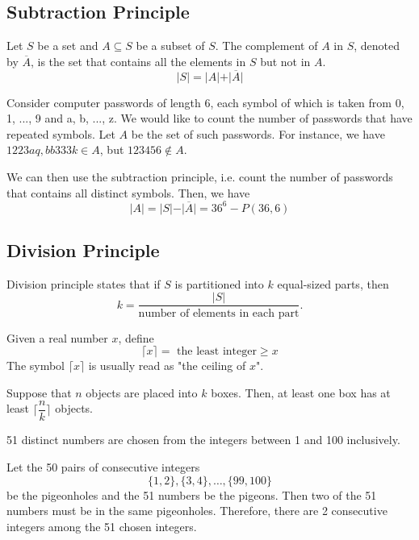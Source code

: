 \subsection{Subtraction Principle}
\begin{definition}
    Let \(S\) be a set and \(A \subseteq S\) be a subset of \(S\). The complement of \(A\) in \(S\), denoted by \(\overline{A}\), is the set that contains all the elements in \(S\) but not in \(A\).
    \[
        \vert S \vert = \vert A \vert + \vert \overline{A} \vert 
    \]
\end{definition}

\begin{eg}
    Consider computer passwords of length 6, each symbol of which is taken from 0, 1, ..., 9 and a, b, ..., z. We would like to count the number of passwords that have repeated symbols. Let \(A\) be the set of such passwords. For instance, we have \(1223aq, bb333k \in A\), but \(123456 \notin A\). 

    We can then use the subtraction principle, i.e. count the number of passwords that contains all distinct symbols. 
    Then, we have
    \[
        \vert A \vert = \vert S \vert - \vert \overline{A} \vert = 36^6 - P(36, 6)
    \]
\end{eg}

\subsection{Division Principle}
Division principle states that if \(S\) is partitioned into \(k\) equal-sized parts, then
\[
    k = \dfrac{\vert S \vert}{\text{number of elements in each part}}.
\]
\begin{definition}
	Given a real number \(x\), define
	\[
		\lceil x \rceil = \text{ the least integer} \geq x
	\]
	The symbol \(\lceil x \rceil\) is usually read as "the ceiling of \(x\)".
\end{definition}

\begin{proposition}
    Suppose that \(n\) objects are placed into \(k\) boxes. Then, at least one box has at least \(\lceil \dfrac{n}{k}\rceil \) objects. 
\end{proposition}
\begin{eg}
    51 distinct numbers are chosen from the integers between 1 and 100 inclusively.

    Let the 50 pairs of consecutive integers
    \[
        \{1, 2\}, \{3, 4\}, \dots, \{99, 100\}
    \]
    be the pigeonholes and the 51 numbers be the pigeons. Then two of the 51 numbers must be in the same pigeonholes. Therefore, there are 2 consecutive integers among the 51 chosen integers.
\end{eg}


